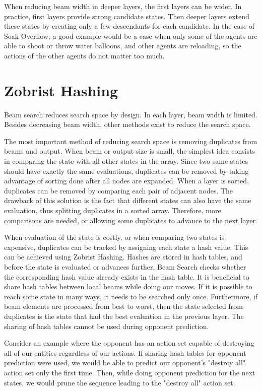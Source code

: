 \documentclass[shortabstract, mgr, english]{iithesis}
\begin{document}
When reducing beam width in deeper layers, the first layers can be wider. In practice, first layers provide strong candidate states. Then deeper layers extend these states by creating only a few descendants for each candidate. In the case of Soak Overflow, a good example would be a case when only some of the agents are able to shoot or throw water balloons, and other agents are reloading, so the actions of the other agents do not matter too much.

\section{Zobrist Hashing}
Beam search reduces search space by design. In each layer, beam width is limited. Besides decreasing beam width, other methods exist to reduce the search space.


The most important method of reducing search space is removing duplicates from beams and output. When beam or output size is small, the simplest idea consists in comparing the state with all other states in the array. Since two same states should have exactly the same evaluations, duplicates can be removed by taking advantage of sorting done after all nodes are expanded. When a layer is sorted, duplicates can be removed by comparing each pair of adjacent nodes. The drawback of this solution is the fact that different states can also have the same evaluation, thus splitting duplicates in a sorted array. Therefore, more comparisons are needed, or allowing some duplicates to advance to the next layer.

When evaluation of the state is costly, or when comparing two states is expensive, duplicates can be tracked by assigning each state a hash value. This can be achieved using Zobrist Hashing\cite{ZobristHashing}. Hashes are stored in hash tables, and before the state is evaluated or advances further, Beam Search checks whether the corresponding hash value already exists in the hash table. It is beneficial to share hash tables between local beams while doing our moves. If it is possible to reach some state in many ways, it needs to be searched only once. Furthermore, if beam elements are processed from best to worst, then the state selected from duplicates is the state that had the best evaluation in the previous layer. The sharing of hash tables cannot be used during opponent prediction.

Consider an example where the opponent has an action set capable of destroying all of our entities regardless of our actions. If sharing hash tables for opponent prediction were used, we would be able to predict our opponent's "destroy all" action set only the first time. Then, while doing opponent prediction for the next states, we would prune the sequence leading to the "destroy all" action set.
\end{document}

